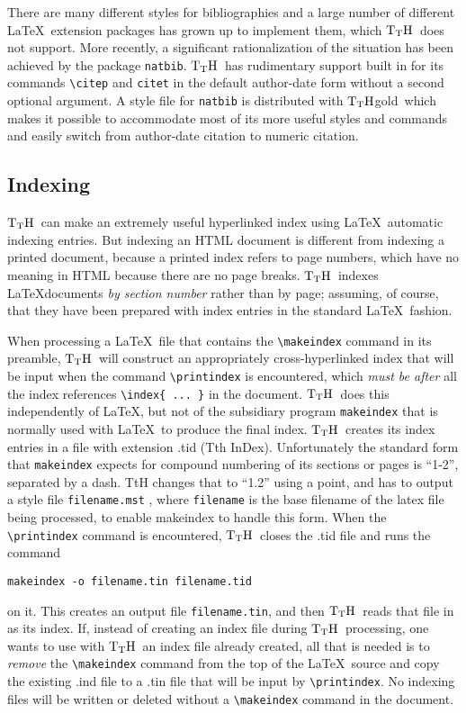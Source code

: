 \documentclass[12pt]{article}
\def\TtH{$\rm{}T_TH$}
\def\TtHgold{\TtH{}gold}
\begin{document}
There are many different styles for bibliographies and a large number
of different \LaTeX\ extension packages has grown up to implement
them, which \TtH\ does not support. More recently, a significant
rationalization of the situation has been achieved by the package
\verb|natbib|.  \TtH\ has rudimentary support built in for its
commands \verb|\citep| and \verb|citet| in the default author-date
form without a second optional argument.  A style file for
\verb|natbib| is distributed with \TtHgold\ which makes it possible to
accommodate most of its more useful styles and commands and easily switch from
author-date citation to numeric citation.

\subsection{Indexing}

\TtH\ can make an extremely useful hyperlinked index using \LaTeX\
automatic indexing entries.  But indexing an HTML document is different
from indexing a printed document, because a printed index refers to
page numbers, which have no meaning in HTML because there are no page
breaks. \TtH\ indexes \LaTeX documents {\em by section number} rather
than by page; assuming, of course, that they have been prepared with
index entries in the standard \LaTeX\ fashion.

 When processing a \LaTeX\ file that contains the
\verb+\makeindex+ command in its preamble, \TtH\ will construct an
appropriately cross-hyperlinked index that will be input when the
command \verb+\printindex+ is encountered, which {\em must be after}
all the index references \verb+\index{ ... }+ in the document. \TtH\
does this independently of \LaTeX, but not of the subsidiary program
\verb+makeindex+ that is normally used with \LaTeX\ to produce the
final index. \TtH\ creates its index entries in a file with extension
.tid (Tth InDex). Unfortunately the standard form that
\verb+makeindex+ expects for compound numbering of its sections or
pages is ``1-2'', separated by a dash. TtH changes that to ``1.2''
using a point, and has to output a style file \verb+filename.mst+ ,
where \verb+filename+ is the base filename of the latex file being
processed, to enable makeindex to handle this form.  When the
\verb+\printindex+ command is encountered, \TtH\ closes the .tid file and
runs the command
\begin{verbatim}
makeindex -o filename.tin filename.tid
\end{verbatim}
on it.  This creates an output file \verb+filename.tin+, and
then \TtH\ reads that file in as its index.  If, instead of creating
an index file during \TtH\ processing, one wants to use with \TtH\ an
index file already created, all that is needed is to {\em remove} the
\verb+\makeindex+ command from the top of the \LaTeX\ source and copy
the existing .ind file to a .tin file that will be input by
\verb+\printindex+. No indexing files will be written or deleted
without a \verb+\makeindex+ command in the document.
\end{document}

